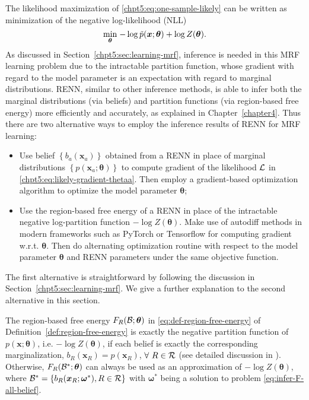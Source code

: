 The likelihood maximization of \eqref{chpt5:eq:one-sample-likely} can be written as minimization of the negative log-likelihood (NLL)
\begin{equation}\label{eq:maximizing-likelihood}
  \underset{\bm{\theta}}{\min}\;{ -\log{\tilde{p}(\bm{x}; \bm{\theta})} + \log{Z(\bm{\theta})}}.
\end{equation}
As discussed in Section~\ref{chpt5:sec:learning-mrf}, inference is needed in this MRF learning problem due to the intractable partition function, whose gradient with regard to the model parameter is an expectation with regard to marginal distributions. RENN, similar to other inference methods, is able to infer both the marginal distributions (via beliefs) and partition functions (via region-based free energy) more efficiently and accurately, as explained in Chapter~\ref{chapter4}. Thus there are two alternative ways to employ the inference results of RENN for MRF learning:
\begin{itemize}
\item Use belief $\left\{ b_{a}(\bm{x}_a) \right\}$ obtained from a RENN in place of marginal distributions $\left\{ p(\bm{x}_a; \bm{\theta}) \right\}$ to compute gradient of the likelihood $\mathcal{L}$ in \eqref{chpt5:eq:likely-gradient-thetaa}. Then employ a gradient-based optimization algorithm to optimize the model parameter $\bm{\theta}$;
  \item Use the region-based free energy of a RENN in place of the intractable negative log-partition function $-\log{Z(\bm{\theta})}$. Make use of autodiff methods in modern frameworks such as PyTorch \cite{pytorch} or Tensorflow \cite{tensorflow} for computing gradient w.r.t. $\bm{\theta}$. Then do alternating optimization routine with respect to the model parameter $\bm{\theta}$ and RENN parameters under the same objective function.
\end{itemize}
The first alternative is straightforward by following the discussion in Section~\ref{chpt5:sec:learning-mrf}. We give a further explanation to the second alternative in this section.

The region-based free energy $F_R(\mathcal{B};\bm{\theta})$ in \eqref{eq:def-region-free-energy} of Definition~\ref{def:region-free-energy} is exactly the negative partition function of $p(\bm{x};\bm{\theta})$, i.e. $-\log{Z(\bm{\theta})}$, if each belief is exactly the corresponding marginalization, $b_R(\bm{x}_R)=p(\bm{x}_{R})$, $\forall~R\in \mathcal{R}$ (see detailed discussion in \cite{yedida2005constucting}). Otherwise, $F_R(\mathcal{B}^{\ast};\bm{\theta})$ can always be used as an approximation of $-\log{Z(\bm{\theta})}$, where $\mathcal{B}^{\ast}= \{b_R(\bm{x}_R; \bm{\omega}^{\ast}), R\in \mathcal{R}\}$ with $\bm{\omega}^{\ast}$ being a solution to problem \eqref{eq:infer-F-all-belief}.

